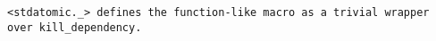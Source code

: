 \tt{<stdatomic._>} defines the function-like macro 
as a trivial wrapper over \tt{kill_dependency}.
